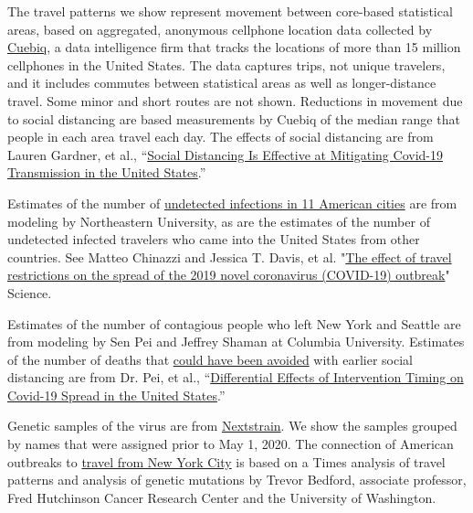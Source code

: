 The travel patterns we show represent movement between core-based
statistical areas, based on aggregated, anonymous cellphone location
data collected by
\href{https://www.cuebiq.com/visitation-insights-covid19/}{Cuebiq}, a
data intelligence firm that tracks the locations of more than 15 million
cellphones in the United States. The data captures trips, not unique
travelers, and it includes commutes between statistical areas as well as
longer-distance travel. Some minor and short routes are not shown.
Reductions in movement due to social distancing are based measurements
by Cuebiq of the median range that people in each area travel each day.
The effects of social distancing are from Lauren Gardner, et al.,
``\href{https://www.medrxiv.org/content/10.1101/2020.05.07.20092353v1}{Social
Distancing Is Effective at Mitigating Covid-19 Transmission in the
United States}.''

Estimates of the number of
\href{https://www.nytimes.com/2020/04/23/us/coronavirus-early-outbreaks-cities.html}{undetected
infections in 11 American cities} are from modeling by Northeastern
University, as are the estimates of the number of undetected infected
travelers who came into the United States from other countries. See
Matteo Chinazzi and Jessica T. Davis, et al.
"\href{https://science.sciencemag.org/content/368/6489/395}{The effect
of travel restrictions on the spread of the 2019 novel coronavirus
(COVID-19) outbreak}" Science.

Estimates of the number of contagious people who left New York and
Seattle are from modeling by Sen Pei and Jeffrey Shaman at Columbia
University. Estimates of the number of deaths that
\href{https://www.nytimes.com/2020/05/20/us/coronavirus-distancing-deaths.html}{could
have been avoided} with earlier social distancing are from Dr. Pei, et
al.,
``\href{https://www.medrxiv.org/content/10.1101/2020.05.15.20103655v2}{Differential
Effects of Intervention Timing on Covid-19 Spread in the United
States}.''

Genetic samples of the virus are from
\href{https://nextstrain.org/ncov/north-america}{Nextstrain}. We show
the samples grouped by names that were assigned prior to May 1, 2020.
The connection of American outbreaks to
\href{https://www.nytimes.com/2020/05/07/us/new-york-city-coronavirus-outbreak.html}{travel
from New York City} is based on a Times analysis of travel patterns and
analysis of genetic mutations by Trevor Bedford, associate professor,
Fred Hutchinson Cancer Research Center and the University of Washington.

